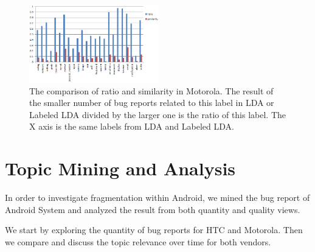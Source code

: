 \documentclass[10pt, conference, compsocconf]{IEEEtran}
\begin{document}
\begin{figure}[htb]
\centering
\includegraphics[width=0.5\textwidth]{motoratiosim.png}
\caption{The comparison of ratio and similarity in Motorola. The result of the smaller number of bug reports related to this label in LDA or Labeled LDA divided by the larger one is the ratio of this label. The X axis is the same labels from LDA and Labeled LDA.}
\end{figure}


\section{Topic Mining and Analysis}

In order to investigate fragmentation within Android, we mined the bug report of Android System and analyzed the result from both quantity and quality views. 

We start by exploring the quantity of bug reports for HTC and Motorola. Then we compare and discuss the topic relevance over time for both vendors.

%
%
%
\end{document}
